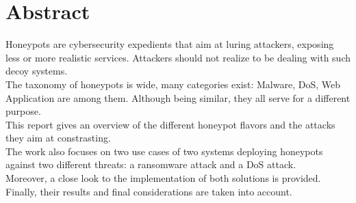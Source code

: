 \chapter*{Abstract}
Honeypots are cybersecurity expedients that aim at luring attackers, exposing less or more realistic services. Attackers should not realize to be dealing with such decoy systems.\\ 
The taxonomy of honeypots is wide, many categories exist: Malware, DoS, Web Application are among them. Although being similar, they all serve for a different purpose.\\ 
This report gives an overview of the different honeypot flavors and the attacks they aim at constrasting. \\ 
The work also focuses on two use cases of two systems deploying honeypots against two different threats: a ransomware attack and a DoS attack.\\ 
Moreover, a close look to the implementation of both solutions is provided.\\ 
Finally, their results and final considerations are taken into account.
